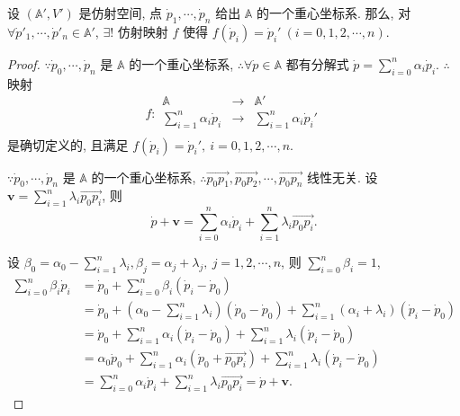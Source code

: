 \documentclass{ctexart}
\begin{document}
\begin{theorem}[书上的命题 2 (ii)]\label{t1.7}
    设 $(\mathbb{A}',V')$ 是仿射空间, 点 $\dot{p}_1,\cdots,\dot{p}_n$ 给出 $\mathbb{A}$ 的一个重心坐标系. 那么, 对 $\forall\dot{p}'_1,\cdots,\dot{p}'_n\in\mathbb{A}'$, $\exists!$ 仿射映射 $f$ 使得 $f(\dot{p}_i)=\dot{p}_i'\ (i=0,1,2,\cdots,n)$.
\end{theorem}
\begin{proof}
    $\because\dot{p}_0,\cdots,\dot{p}_n$ 是 $\mathbb{A}$ 的一个重心坐标系, $\therefore\forall\dot{p}\in\mathbb{A}$ 都有分解式 $\dot{p}=\sum\limits_{i=0}^n\alpha_i\dot{p}_i$. $\therefore$ 映射
    \[f:\begin{array}{rcl}
        \mathbb{A} & \to & \mathbb{A}' \\
        \sum\limits_{i=1}^n\alpha_i\dot{p}_i & \to & \sum\limits_{i=1}^n\alpha_i\dot{p}_i' \\
    \end{array}\]
    是确切定义的, 且满足 $f(\dot{p}_i)=\dot{p}_i',\ i=0,1,2,\cdots,n$.
    
    $\because\dot{p}_0,\cdots,\dot{p}_n$ 是 $\mathbb{A}$ 的一个重心坐标系, $\therefore\overrightarrow{p_0p_1},\overrightarrow{p_0p_2},\cdots,\overrightarrow{p_0p_n}$ 线性无关. 设 $\boldsymbol{v}=\sum\limits_{i=1}^n\lambda_i\overrightarrow{p_0p_i}$, 则
    \[\dot{p}+\boldsymbol{v}=\sum\limits_{i=0}^n\alpha_i\dot{p}_i+\sum\limits_{i=1}^n\lambda_i\overrightarrow{p_0p_i}.\]

    设 $\beta_0=\alpha_0-\sum\limits_{i=1}^n\lambda_i,\beta_j=\alpha_j+\lambda_j,\ j=1,2,\cdots,n$, 则 $\sum\limits_{i=0}^n\beta_i=1$,
    \begin{align*}
        \sum\limits_{i=0}^n\beta_i\dot{p}_i & =\dot{p}_0+\sum\limits_{i=0}^n\beta_i(\dot{p}_i-\dot{p}_0) \\
        & =\dot{p}_0+\left(\alpha_0-\sum\limits_{i=1}^n\lambda_i\right)(\dot{p}_0-\dot{p}_0)+\sum\limits_{i=1}^n(\alpha_i+\lambda_i)(\dot{p}_i-\dot{p}_0) \\
        & =\dot{p}_0+\sum\limits_{i=1}^n\alpha_i(\dot{p}_i-\dot{p}_0)+\sum\limits_{i=1}^n\lambda_i(\dot{p}_i-\dot{p}_0) \\
        & =\alpha_0\dot{p}_0+\sum\limits_{i=1}^n\alpha_i(\dot{p}_0+\overrightarrow{p_0p_i})+\sum\limits_{i=1}^n\lambda_i(\dot{p}_i-\dot{p}_0) \\
        & =\sum\limits_{i=0}^n\alpha_i\dot{p}_i+\sum\limits_{i=1}^n\lambda_i\overrightarrow{p_0p_i}=\dot{p}+\boldsymbol{v}.
    \end{align*}


\end{proof}
\end{document}
